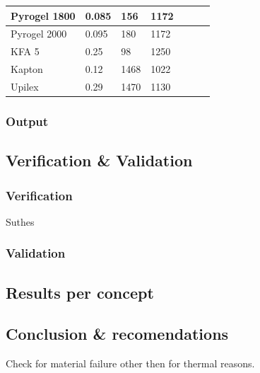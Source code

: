 \begin{table}[H]
\begin{tabular}{|l|l|l|l|l|l|}
    Pyrogel 1800      & 0.085                                                 & 156                                        & 1172                                            & ~ 	 & ~                                          \\ \hline
    Pyrogel 2000      & 0.095                                                 & 180                                        & 1172                                            & ~ 	 & ~                                          \\ \hline
    KFA 5             & 0.25                                                  & 98                                         & 1250                                            & ~ 	 & ~                                          \\ \hline
    Kapton            & 0.12                                                  & 1468                                       & 1022                                            & ~	 & ~                                          \\ \hline
    Upilex            & 0.29                                                  & 1470                                       & 1130                                            & ~ 	 & ~                                          \\ \hline
    \end{tabular}
    \label{tab:tpsmatprop}
\end{table}

\subsubsection{Output}


\subsection{Verification \& Validation}

\subsubsection{Verification}
Suthes
\subsubsection{Validation}



\subsection{Results per concept}



\subsection{Conclusion \& recomendations}
Check for material failure other then for thermal reasons.
